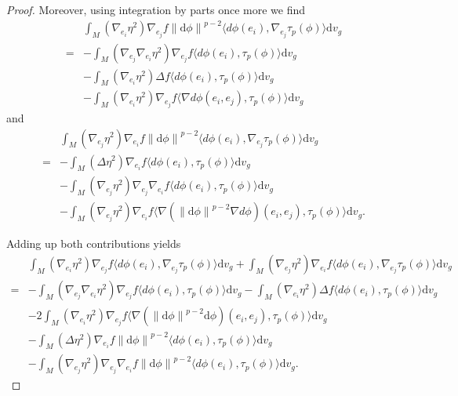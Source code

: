 \documentclass[12pt,UTF8]{article}
\theoremstyle{plain}
\theoremstyle{definition}
\def\d {\mathrm{d}}
\def\na{\ensuremath{\nabla}}
\renewcommand{\d}[1]{\mathbb{#1}}
\renewcommand{\(}{\left(}
\renewcommand{\)}{\right)}
\newcommand{\norm}[1]{\left\lVert#1\right\rVert}%
\numberwithin{equation}{subsection}
\def\na{\nabla}
\newcommand{\dv}{\operatorname{div}}
\renewcommand{\(}{\left(}
\renewcommand{\)}{\right)}
\def\d{\mathrm{d}}
\def \d {\mathrm{d}}
\def\dv{\d v_g}
\numberwithin{equation}{section}
\begin{document}
\begin{proof}
	Moreover, using integration by parts once more we find
\begin{equation}\label{6}
	\begin{split}
		&\int_M(\nabla_{e_i}\eta^2)\nabla_{e_j} f\norm{\d \phi}^{p-2} \langle d\phi(e_i),\na_{e_j}\tau_p(\phi)\rangle \dv\\ 
		=&-\int_M(\nabla_{e_j}\nabla_{e_i}\eta^2)\nabla_{e_j} f\langle d\phi(e_i),\tau_p(\phi)\rangle \dv \\
		&-\int_M(\nabla_{e_i}\eta^2)\Delta f\langle d\phi(e_i),\tau_p(\phi)\rangle \dv \\
		&-\int_M(\nabla_{e_i}\eta^2)\nabla_{e_j} f\langle\na d\phi(e_i,e_j),\tau_p(\phi)\rangle \dv
	\end{split}
\end{equation}
	and 
\begin{equation}\label{7}
	\begin{split}
			&\int_M(\nabla_{e_j}\eta^2)\nabla_{e_i} f\norm{\d \phi}^{p-2}\langle d\phi(e_i),\na_{e_j}\tau_p(\phi)\rangle \dv \\
		=&-\int_M(\Delta\eta^2)\nabla_{e_i} f\langle d\phi(e_i),\tau_p(\phi)\rangle \dv \\
		&-\int_M(\nabla_{e_j}\eta^2)\nabla_{e_j}\nabla_{e_i}f
		\langle d\phi(e_i),\tau_p(\phi)\rangle \dv \\
		&-\int_M(\nabla_{e_j}\eta^2)\nabla_{e_i} f\langle\na(\norm{\d \phi}^{p-2}\nabla d\phi)(e_i,e_j),\tau_p(\phi)\rangle \dv.
	\end{split}
\end{equation}
	
	Adding up both contributions yields
\begin{equation}\label{8}
	\begin{split}
		&\int_M(\nabla_{e_i}\eta^2)\nabla_{e_j}f\langle d\phi(e_i),\na_{e_j}\tau_p(\phi)\rangle \dv 
		+\int_M(\nabla_{e_j}\eta^2)\nabla_{e_i}f\langle d\phi(e_i),\na_{e_j}\tau_p(\phi)\rangle \dv \\
		=&-\int_M(\nabla_{e_j}\nabla_{e_i}\eta^2)\nabla_{e_j}f\langle d\phi(e_i),\tau_p(\phi)\rangle \dv
		-\int_M(\nabla_{e_i}\eta^2)\Delta f\langle d\phi(e_i),\tau_p(\phi)\rangle \dv \\
		&-2\int_M(\nabla_{e_i}\eta^2)\nabla_{e_j}f\langle\na (\norm{\d \phi}^{p-2}\d\phi)(e_i,e_j),\tau_p(\phi)\rangle \dv\\
		&-\int_M(\Delta\eta^2)\nabla_{e_i}f\norm{\d \phi}^{p-2}\langle d\phi(e_i),\tau_p(\phi)\rangle \dv \\
		&-\int_M(\nabla_{e_j}\eta^2)\nabla_{e_j}\nabla_{e_i}f \norm{\d \phi}^{p-2} \langle d\phi(e_i),\tau_p(\phi)\rangle \dv.
	\end{split}
\end{equation}
	

\end{proof}
\end{document}
